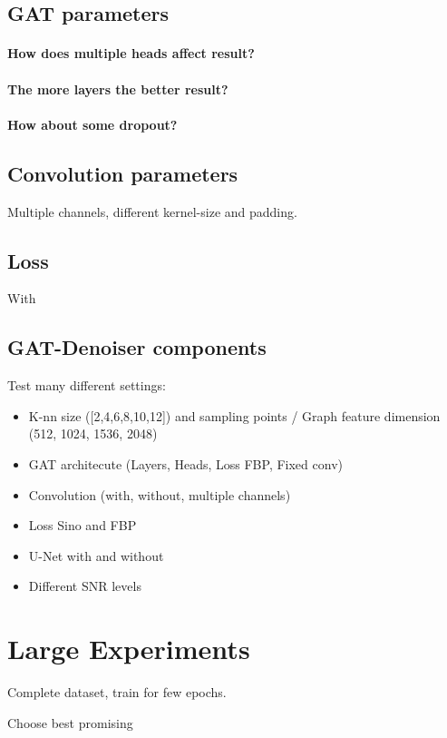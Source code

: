 \subsection{GAT parameters}

\paragraph{How does multiple heads affect result?}
\paragraph{The more layers the better result?}
\paragraph{How about some dropout?}

\subsection{Convolution parameters}
Multiple channels, different kernel-size and padding.

\subsection{Loss}
With 

\subsection{GAT-Denoiser components}



Test many different settings:
\begin{itemize}
  \item K-nn size ([2,4,6,8,10,12]) and sampling points / Graph feature dimension (512, 1024, 1536, 2048)
 
  \item GAT architecute (Layers, Heads, Loss FBP, Fixed conv)
  \item Convolution (with, without, multiple channels)
  \item Loss Sino and FBP
  \item U-Net with and without
  \item Different SNR levels

  
  
\end{itemize}


\section{Large Experiments}
Complete dataset, train for few epochs.

Choose best promising 
